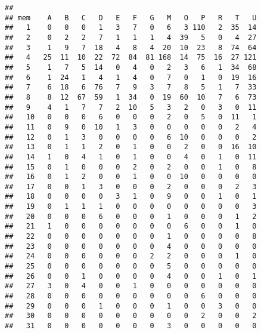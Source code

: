 \documentclass[
]{article}
\newenvironment{Shaded}{\begin{snugshade}}{\end{snugshade}}
\newcommand{\CommentTok}[1]{\textcolor[rgb]{0.56,0.35,0.01}{\textit{#1}}}
\newcommand{\KeywordTok}[1]{\textcolor[rgb]{0.13,0.29,0.53}{\textbf{#1}}}
\newcommand{\NormalTok}[1]{#1}
\begin{document}
\begin{verbatim}
##     
## mem    A   B   C   D   E   F   G   M   O   P   R   T   U
##   1    0   0   0   1   3   7   0   6   3 110   2  35  14
##   2    0   2   2   7   1   1   1   4  39   5   0   4  27
##   3    1   9   7  18   4   8   4  20  10  23   8  74  64
##   4   25  11  10  22  72  84  81 168  14  75  16  27 121
##   5    1   7   5  14   0   4   0   2   3   6   1  34  68
##   6    1  24   1   4   1   4   0   7   0   1   0  19  16
##   7    6  18   6  76   7   9   3   7   8   5   1   7  33
##   8    8  12  67  59   1  34   0  19  60  10   7   6  73
##   9    4   1   7   7   2  10   5   3   2   0   3   0  11
##   10   0   0   0   6   0   0   0   2   0   5   0  11   1
##   11   0   9   0  10   1   3   0   0   0   0   0   2   4
##   12   0   1   3   0   0   0   0   6  10   0   0   0   2
##   13   0   1   1   2   0   1   0   0   2   0   0  16  10
##   14   1   0   4   1   0   1   0   0   4   0   1   0  11
##   15   0   1   0   0   0   2   0   2   0   0   1   0   8
##   16   0   1   2   0   0   1   0   0  10   0   0   0   0
##   17   0   0   1   3   0   0   0   2   0   0   0   2   3
##   18   0   0   0   0   3   1   0   9   0   0   1   0   1
##   19   0   1   1   1   0   0   0   0   0   0   0   0   3
##   20   0   0   0   6   0   0   0   1   0   0   0   1   2
##   21   1   0   0   0   0   0   0   0   6   0   0   1   0
##   22   0   0   0   0   0   0   0   1   0   0   0   0   8
##   23   0   0   0   0   0   0   0   4   0   0   0   0   0
##   24   0   0   0   0   0   0   2   2   0   0   0   1   0
##   25   0   0   0   0   0   0   0   5   0   0   0   0   0
##   26   0   0   1   0   0   0   0   4   0   0   1   0   1
##   27   3   0   4   0   0   1   0   0   0   0   0   0   0
##   28   0   0   0   0   0   0   0   0   0   6   0   0   0
##   29   0   0   0   1   0   0   0   1   0   0   3   0   0
##   30   0   0   0   0   0   0   0   0   0   2   0   0   2
##   31   0   0   0   0   0   0   0   3   0   0   0   0   0
\end{verbatim}

\begin{Shaded}
\end{Shaded}
\end{document}
